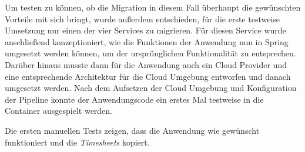 Um testen zu können, ob die Migration in diesem Fall überhaupt die gewünschten Vorteile mit sich bringt, wurde außerdem entschieden, für die erste testweise Umsetzung nur einen der vier Services zu migrieren. Für diesen Service wurde anschließend konzeptioniert, wie die Funktionen der Anwendung nun in Spring umgesetzt werden können, um der ursprünglichen Funktionalität zu entsprechen. Darüber hinaus musste dann für die Anwendung auch ein Cloud Provider und eine entsprechende Architektur für die Cloud Umgebung entworfen und danach umgesetzt werden. Nach dem Aufsetzen der Cloud Umgebung und Konfiguration der Pipeline konnte der Anwendungscode ein erstes Mal testweise in die Container ausgespielt werden.

Die ersten manuellen Tests zeigen, dass die Anwendung wie gewünscht funktioniert und die \textit{\glspl{Timesheet}} kopiert. \pagebreak